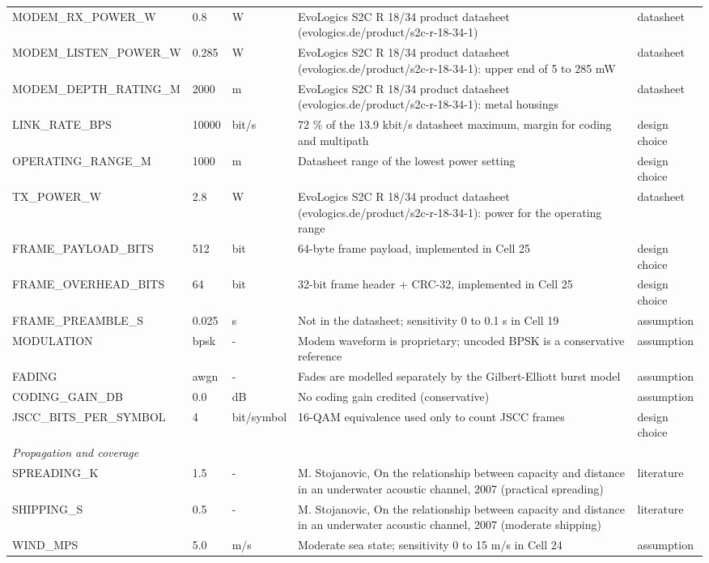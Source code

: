 \begin{table}[t]
\begin{tabular}{p{3.3cm}p{2.6cm}p{1.6cm}p{6.6cm}p{2.0cm}}
MODEM\_RX\_POWER\_W & 0.8 & W & EvoLogics S2C R 18/34 product datasheet (evologics.de/product/s2c-r-18-34-1) & datasheet \\
MODEM\_LISTEN\_POWER\_W & 0.285 & W & EvoLogics S2C R 18/34 product datasheet (evologics.de/product/s2c-r-18-34-1): upper end of 5 to 285 mW & datasheet \\
MODEM\_DEPTH\_RATING\_M & 2000 & m & EvoLogics S2C R 18/34 product datasheet (evologics.de/product/s2c-r-18-34-1): metal housings & datasheet \\
LINK\_RATE\_BPS & 10000 & bit/s & 72 \% of the 13.9 kbit/s datasheet maximum, margin for coding and multipath & design choice \\
OPERATING\_RANGE\_M & 1000 & m & Datasheet range of the lowest power setting & design choice \\
TX\_POWER\_W & 2.8 & W & EvoLogics S2C R 18/34 product datasheet (evologics.de/product/s2c-r-18-34-1): power for the operating range & datasheet \\
FRAME\_PAYLOAD\_BITS & 512 & bit & 64-byte frame payload, implemented in Cell 25 & design choice \\
FRAME\_OVERHEAD\_BITS & 64 & bit & 32-bit frame header + CRC-32, implemented in Cell 25 & design choice \\
FRAME\_PREAMBLE\_S & 0.025 & s & Not in the datasheet; sensitivity 0 to 0.1 s in Cell 19 & assumption \\
MODULATION & bpsk & - & Modem waveform is proprietary; uncoded BPSK is a conservative reference & assumption \\
FADING & awgn & - & Fades are modelled separately by the Gilbert-Elliott burst model & assumption \\
CODING\_GAIN\_DB & 0.0 & dB & No coding gain credited (conservative) & assumption \\
JSCC\_BITS\_PER\_SYMBOL & 4 & bit/symbol & 16-QAM equivalence used only to count JSCC frames & design choice \\
\multicolumn{5}{l}{\textit{Propagation and coverage}} \\
SPREADING\_K & 1.5 & - & M. Stojanovic, On the relationship between capacity and distance in an underwater acoustic channel, 2007 (practical spreading) & literature \\
SHIPPING\_S & 0.5 & - & M. Stojanovic, On the relationship between capacity and distance in an underwater acoustic channel, 2007 (moderate shipping) & literature \\
WIND\_MPS & 5.0 & m/s & Moderate sea state; sensitivity 0 to 15 m/s in Cell 24 & assumption \\

\end{tabular}
\end{table}
